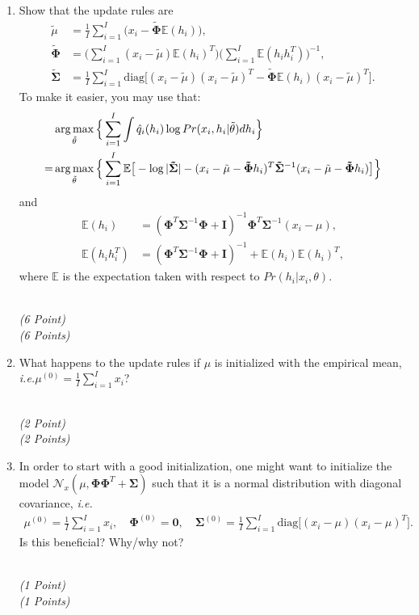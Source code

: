 \documentclass[11pt]{article}
\makeatletter
\newcommand{\points}[1]{
    \ifthenelse{\equal{#1}{1}}
        {\\ \emph{(#1 Point)}}
        {\\ \emph{(#1 Points)}}
}
\newcommand{\mat}[1]{
    \mathbf{#1}
}
\newcommand{\argmax}{\operatornamewithlimits{arg\,max}}
\def\IE{\mathbb{E}}
\def\ie{\emph{i.e.}\@\xspace}
\makeatother
\begin{document}
\begin{enumerate}
\begin{enumerate}
        \points{2}
        \item Show that the update rules are
              \begin{align*}
                  \tilde \mu         &= \frac{1}{I} \sum_{i=1}^I \big( x_i - \mat{\tilde \Phi} \IE(h_i) \big), \\
                  \mat{\tilde\Phi}   &= \Big( \sum_{i=1}^I (x_i - \tilde \mu) \IE(h_i)^T \Big) \Big( \sum_{i=1}^I \IE(h_ih_i^T) \Big)^{-1}, \\
                  \mat{\tilde\Sigma} &= \frac{1}{I} \sum_{i=1}^I \mathrm{diag} \Big[ (x_i - \tilde \mu)(x_i - \tilde \mu)^T - \mat{\tilde\Phi} \IE(h_i)(x_i - \tilde \mu)^T \Big].
              \end{align*}
              To make it easier, you may use that:
              \begin{align*}
                   & \argmax_{\tilde \theta} \Big\{ \sum_{i=1}^I \int \hat q_i(h_i) \log Pr(x_i,h_i|\tilde \theta) dh_i \Big\} \\
                  =& \argmax_{\tilde \theta} \Big\{ \sum_{i=1}^I \IE \big[ -\log |\mat{\tilde \Sigma}| - (x_i - \tilde \mu - \mat{\tilde \Phi}h_i)^T \mat{\tilde \Sigma}^{-1}
                                                                                                    (x_i - \tilde \mu - \mat{\tilde \Phi}h_i) \big] \Big\}
              \end{align*}
              and
              \begin{align*}
                  \IE(h_i)      &= (\mat{\Phi}^T \mat{\Sigma}^{-1} \mat{\Phi} + \mat{I})^{-1} \mat{\Phi}^T \mat{\Sigma}^{-1} (x_i - \mu), \\
                  \IE(h_ih_i^T) &= (\mat{\Phi}^T \mat{\Sigma}^{-1} \mat{\Phi} + \mat{I})^{-1} + \IE(h_i) \IE(h_i)^T,
              \end{align*}
              where $ \IE $ is the expectation taken with respect to $ Pr(h_i|x_i,\theta) $.
        \points{6}
        \item What happens to the update rules if $ \mu $ is initialized with the empirical mean, \ie $ \mu^{(0)} = \frac{1}{I}\sum_{i=1}^I x_i $?
        \points{2}
        \item In order to start with a good initialization, one might want to initialize the model $ \mathcal{N}_x(\mu, \mat{\Phi}\mat{\Phi}^T + \mat{\Sigma}) $ such that it is a normal distribution
              with diagonal covariance, \ie
              \begin{align*}
                  \mu^{(0)} = \frac{1}{I}\sum_{i=1}^I x_i, \quad \mat{\Phi}^{(0)} = \mat{0}, \quad \mat{\Sigma}^{(0)} = \frac{1}{I}\sum_{i=1}^I \mathrm{diag} \big[ (x_i - \mu)(x_i - \mu)^T \big].
              \end{align*}
              Is this beneficial? Why/why not?
        \points{1}
    \end{enumerate}
\end{enumerate}
\end{document}
